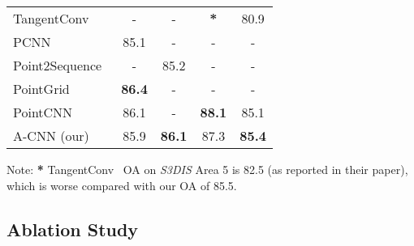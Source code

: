\documentclass[10pt,twocolumn,letterpaper]{article}
\begin{document}
\begin{table}[h]
{\begin{tabular}{@{}l|c|c|c|c}
TangentConv~\cite{tatarchenko2018tangent} & - & - & \textbf{*} & 80.9 \\
PCNN~\cite{atzmon2018point}       & 85.1 &  - & - & - \\
Point2Sequence~\cite{liu2018point2sequence} & - & 85.2 & - & - \\
PointGrid~\cite{le2018pointgrid} & \textbf{86.4} & - & - & - \\
PointCNN~\cite{li2018pointcnn}     & 86.1 & - & \textbf{88.1} & 85.1 \\ \hline
A-CNN (our)  & 85.9 & \textbf{86.1} & 87.3 & \textbf{85.4}  \\ \hline
\end{tabular}
} \label{table:s3dis_eval}
 \begin{tablenotes}
      \centering
      \footnotesize \item Note: \textbf{*} TangentConv~\cite{tatarchenko2018tangent} OA on \emph{S3DIS} Area 5 is 82.5 (as reported in their paper), which is worse compared with our OA of 85.5.\vspace{-3mm}
    \end{tablenotes}
\end{table}







\vspace{-1mm}
\subsection{Ablation Study} \vspace{-1mm}
\label{sec:ablation}
\end{document}
